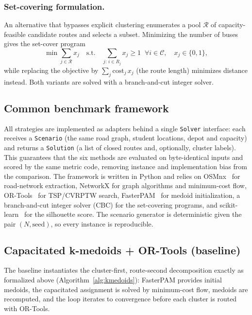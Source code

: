 \documentclass[runningheads]{llncs}
\begin{document}
\subsubsection{Set-covering formulation.}
An alternative that bypasses explicit clustering enumerates a pool
$\mathcal{R}$ of capacity-feasible candidate routes and selects a
subset. Minimizing the number of buses gives the set-cover program
\begin{equation}
\min \sum_{j\in\mathcal{R}} x_j \quad\text{s.t.}\quad
\sum_{j:\,i\in R_j} x_j \ge 1\;\;\forall i\in\mathcal{C},\quad
x_j\in\{0,1\},
\label{eq:setcover}
\end{equation}
while replacing the objective by $\sum_j \mathrm{cost}_j\,x_j$ (the
route length) minimizes distance instead. Both variants are solved
with a branch-and-cut integer solver.

\subsection{Common benchmark framework}\label{sec:framework}
All strategies are implemented as adapters behind a single
\texttt{Solver} interface: each receives a \texttt{Scenario} (the same
road graph, student locations, depot and capacity) and returns a
\texttt{Solution} (a list of closed routes and, optionally, cluster
labels). This guarantees that the six methods are evaluated on
byte-identical inputs and scored by the same metric code, removing
instance and implementation bias from the comparison. The framework is
written in Python and relies on OSMnx~\cite{Boeing2017OSMnx} for
road-network extraction, NetworkX for graph algorithms and minimum-cost
flow, OR-Tools~\cite{PerronFurnon2023ORTools} for TSP/CVRPTW search,
FasterPAM~\cite{KaufmanRousseeuw1990PAM} for medoid initialization, a
branch-and-cut integer solver (CBC) for the set-covering programs, and
scikit-learn~\cite{Pedregosa2011Sklearn} for the silhouette score. The
scenario generator is deterministic given the pair $(N,\text{seed})$, so
every instance is reproducible.

\subsection{Capacitated k-medoids + OR-Tools (baseline)}
The baseline instantiates the cluster-first, route-second
decomposition exactly as formalized above (Algorithm~\ref{alg:kmedoids}):
FasterPAM provides initial medoids, the capacitated assignment is
solved by minimum-cost flow, medoids are recomputed, and the loop
iterates to convergence before each cluster is routed with OR-Tools.
\end{document}
